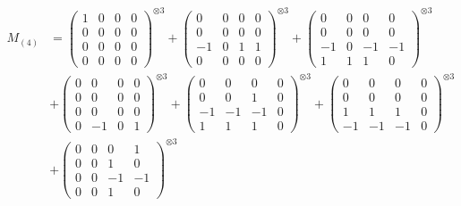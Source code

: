 \documentclass{article}
\newcommand{\Mthree}{%
    M_{(4)}
}
\begin{document}
        \newpage
        
        \footnotesize{
        \begin{align}
        \Mthree
        &= \label{Rs16-Rc11-Solution-5-c1} \begin{pmatrix} 1 & 0 & 0 & 0 \\ 0 & 0 & 0 & 0 \\ 0 & 0 & 0 & 0 \\ 0 & 0 & 0 & 0 \end{pmatrix}^{\otimes 3} 
            + \begin{pmatrix} 0 & 0 & 0 & 0 \\ 0 & 0 & 0 & 0 \\ -1 & 0 & 1 & 1 \\ 0 & 0 & 0 & 0 \end{pmatrix}^{\otimes 3} 
            + \begin{pmatrix} 0 & 0 & 0 & 0 \\ 0 & 0 & 0 & 0 \\ -1 & 0 & -1 & -1 \\ 1 & 1 & 1 & 0 \end{pmatrix}^{\otimes 3} \\
        &+ \label{Rs16-Rc11-Solution-5-c4} \begin{pmatrix} 0 & 0 & 0 & 0 \\ 0 & 0 & 0 & 0 \\ 0 & 0 & 0 & 0 \\ 0 & -1 & 0 & 1 \end{pmatrix}^{\otimes 3} 
            + \begin{pmatrix} 0 & 0 & 0 & 0 \\ 0 & 0 & 1 & 0 \\ -1 & -1 & -1 & 0 \\ 1 & 1 & 1 & 0 \end{pmatrix}^{\otimes 3} 
            + \begin{pmatrix} 0 & 0 & 0 & 0 \\ 0 & 0 & 0 & 0 \\ 1 & 1 & 1 & 0 \\ -1 & -1 & -1 & 0 \end{pmatrix}^{\otimes 3} \\
        &+ \label{Rs16-Rc11-Solution-5-c7} \begin{pmatrix} 0 & 0 & 0 & 1 \\ 0 & 0 & 1 & 0 \\ 0 & 0 & -1 & -1 \\ 0 & 0 & 1 & 0 \end{pmatrix}^{\otimes 3} 

\end{align}}
\end{document}
